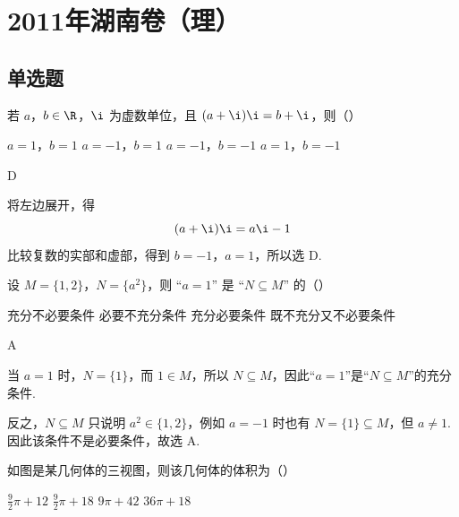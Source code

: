 \chapter{2011年湖南卷（理）}

\section{单选题}

\begin{problem}
若 \(a\)，\(b \in \R\)，\(\i\) 为虚数单位，且 \((a + \i)\i = b + \i\)，则（\quad）

\choices
    {\(a = 1\)，\(b = 1\)}
    {\(a = -1\)，\(b = 1\)}
    {\(a = -1\)，\(b = -1\)}
    {\(a = 1\)，\(b = -1\)}
\end{problem}

\begin{answer}
D
\end{answer}

\begin{solution}
将左边展开，得
\[
(a+\i)\i=a\i-1
\]
比较复数的实部和虚部，得到 \(b=-1\)，\(a=1\)，所以选 D.
\end{solution}

\begin{problem}
设 \(M = \{1, 2\}\)，\(N = \{a^2\}\)，则 “\(a = 1\)” 是 “\(N \subseteq M\)” 的（\quad）

\choices
    {充分不必要条件}
    {必要不充分条件}
    {充分必要条件}
    {既不充分又不必要条件}
\end{problem}

\begin{answer}
A
\end{answer}

\begin{solution}
当 \(a=1\) 时，\(N=\{1\}\)，而 \(1\in M\)，所以 \(N\subseteq M\)，因此“\(a=1\)”是“\(N\subseteq M\)”的充分条件.

反之，\(N\subseteq M\) 只说明 \(a^2\in\{1,2\}\)，例如 \(a=-1\) 时也有 \(N=\{1\}\subseteq M\)，但 \(a\ne1\). 因此该条件不是必要条件，故选 A.
\end{solution}

\begin{problem}
如图是某几何体的三视图，则该几何体的体积为（\quad）


\choices
    {\(\frac{9}{2}\pi + 12\)}
    {\(\frac{9}{2}\pi + 18\)}
    {\(9\pi + 42\)}
    {\(36\pi + 18\)}
\end{problem}

